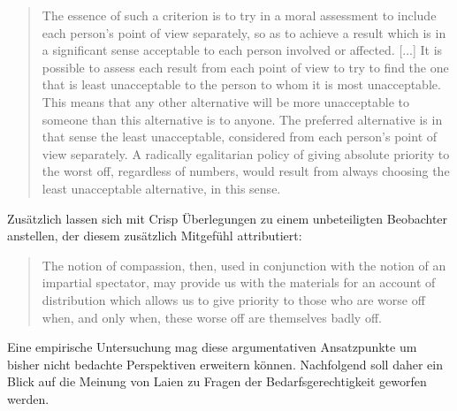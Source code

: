 \documentclass[a4paper]{thesis}
\begin{document}
\begin{quote}
The essence of such a criterion is to try in a moral assessment to include each person's point of view separately, so as to achieve a result which is in a significant sense acceptable to each person involved or affected. [...] It is possible to assess each result from each point of view to try to find the one that is least unacceptable to the person to whom it is most unacceptable. This means that any other alternative will be more unacceptable to someone than this alternative is to anyone. The preferred alternative is in that sense the least unacceptable, considered from each person's point of view separately. A radically egalitarian policy of giving absolute priority to the worst off, regardless of numbers, would result from always choosing the least unacceptable alternative, in this sense.
\end{quote}

Zusätzlich lassen sich mit Crisp Überlegungen zu einem unbeteiligten Beobachter anstellen, der diesem zusätzlich Mitgefühl attributiert:

\begin{quote}
The notion of compassion, then, used in conjunction with the notion of an impartial spectator, may provide us with the materials for an account of distribution which allows us to give priority to those who are worse off when, and only when, these worse off are themselves badly off.
\end{quote}

Eine empirische Untersuchung mag diese argumentativen Ansatzpunkte um bisher nicht bedachte Perspektiven erweitern können. Nachfolgend soll daher ein Blick auf die Meinung von Laien zu Fragen der Bedarfsgerechtigkeit geworfen werden.

\cleardoublepage
\end{document}
